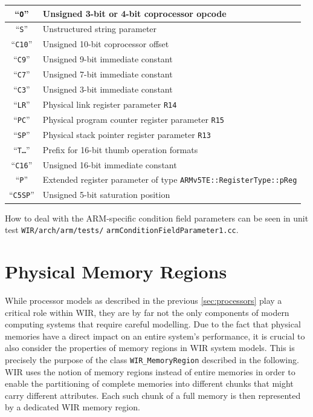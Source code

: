 \begin{table}[ht]
\begin{center}
\begin{tabular}{|c|p{136mm}|}
      \hline
      ``\texttt{O}'' & Unsigned 3-bit or 4-bit coprocessor opcode \\
      \hline
      ``\texttt{S}'' & Unstructured string parameter \\
      \hhline{|=|=|}
      ``\texttt{C10}'' & Unsigned 10-bit coprocessor offset \\
      \hline
      ``\texttt{C9}'' & Unsigned 9-bit immediate constant \\
      \hline
      ``\texttt{C7}'' & Unsigned 7-bit immediate constant \\
      \hline
      ``\texttt{C3}'' & Unsigned 3-bit immediate constant \\
      \hline
      ``\texttt{LR}'' & Physical link register parameter \texttt{R14} \\
      \hline
      ``\texttt{PC}'' & Physical program counter register parameter \texttt{R15} \\
      \hline
      ``\texttt{SP}'' & Physical stack pointer register parameter \texttt{R13} \\
      \hline
      ``\texttt{T\dots}'' & Prefix for 16-bit thumb operation formats \\
      \hhline{|=|=|}
      ``\texttt{C16}'' & Unsigned 16-bit immediate constant \\
      \hhline{|=|=|}
      ``\texttt{P}'' & Extended register parameter of type \texttt{ARMv5TE::RegisterType::pReg} \\
      \hhline{|=|=|}
      ``\texttt{C5SP}'' & Unsigned 5-bit saturation position \\
      \hline
    \end{tabular}
  \end{center}
\end{table}

How to deal with the ARM-specific condition field parameters can be seen in unit test \texttt{WIR/arch/arm/tests/} \texttt{armConditionFieldParameter1.cc}.


\section{Physical Memory Regions}
\label{sec:memoryregions}

While processor models as described in the previous \cref{sec:processors} play a critical role within \gls{WIR}, they are by far not the only components of modern computing systems that require careful modelling.
Due to the fact that physical memories have a direct impact on an entire system's performance, it is crucial to also consider the properties of memory regions in \gls{WIR} system models.
This is precisely the purpose of the class \texttt{WIR\_MemoryRegion} described in the following.
\gls{WIR} uses the notion of memory regions instead of entire memories in order to enable the partitioning of complete memories into different chunks that might carry different attributes.
Each such chunk of a full memory is then represented by a dedicated \gls{WIR} memory region.


